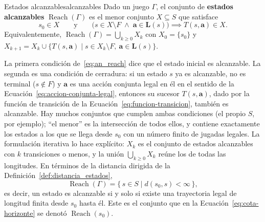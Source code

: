 \begin{definicion}{Estados alcanzables}{alcanzables}
Dado un juego $\Gamma$, el conjunto de \textbf{estados alcanzables} $\operatorname{Reach}(\Gamma)$ es el menor conjunto $X \subseteq S$ que satisface
\begin{equation}
    s_0 \in X
    \qquad\text{y}\qquad
    \big(s \in X \setminus F \;\land\; \mathbf a \in \mathbf L(s)\big) \implies T(s,\mathbf a) \in X .
    \label{eq:an_reach}
\end{equation}
Equivalentemente, $\operatorname{Reach}(\Gamma) = \bigcup_{k \ge 0} X_k$ con $X_0 = \{s_0\}$ y $X_{k+1} = X_k \cup \{T(s,\mathbf a) \mid s \in X_k \setminus F,\ \mathbf a \in \mathbf L(s)\}$.
\end{definicion}

La primera condición de~\eqref{eq:an_reach} dice que el estado inicial es alcanzable. La segunda es una condición de cerradura: si un estado $s$ ya es alcanzable, no es terminal ($s \notin F$) y $\mathbf a$ es una acción conjunta legal en él en el sentido de la Ecuación~\eqref{eq:accion-conjunta-legal}, entonces su sucesor $T(s, \mathbf a)$, dado por la función de transición de la Ecuación~\eqref{eq:funcion-transicion}, también es alcanzable. Hay muchos conjuntos que cumplen ambas condiciones (el propio $S$, por ejemplo); ``el menor'' es la intersección de todos ellos, y contiene exactamente los estados a los que se llega desde $s_0$ con un número finito de jugadas legales. La formulación iterativa lo hace explícito: $X_k$ es el conjunto de estados alcanzables con $k$ transiciones o menos, y la unión $\bigcup_{k \ge 0} X_k$ reúne los de todas las longitudes. En términos de la distancia dirigida de la Definición~\ref{def:distancia_estados},
\begin{equation}
    \operatorname{Reach}(\Gamma) = \{\, s \in S \mid d(s_0, s) < \infty \,\},
    \label{eq:an_reach_distancia}
\end{equation}
es decir, un estado es alcanzable si y solo si existe una trayectoria legal de longitud finita desde $s_0$ hasta él. Este es el conjunto que en la Ecuación~\eqref{eq:cota-horizonte} se denotó $\operatorname{Reach}(s_0)$.

